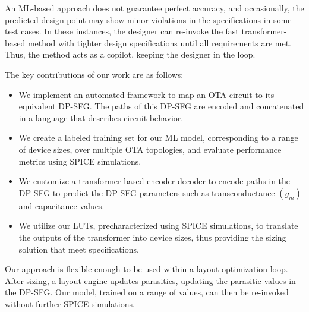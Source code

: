 An ML-based approach does not guarantee perfect accuracy, and occasionally, the predicted design point may show minor violations in the specifications in some test cases. 
In these instances, the designer can re-invoke the fast transformer-based method with tighter design specifications until all requirements are met. Thus, the method acts as a copilot, keeping the designer in the loop. 

The key contributions of our work are as follows:
\vspace{-0.05cm}
\begin{itemize}
\setlength\itemsep{0.05cm}
    \item We implement an automated framework to map an OTA circuit to its equivalent DP-SFG. The paths of this DP-SFG are encoded and concatenated in a language that describes circuit behavior.

    \item We create a labeled training set for our ML model, corresponding to a range of device sizes, over multiple OTA topologies, and evaluate performance metrics using SPICE simulations. 
    
    \item We customize a transformer-based encoder-decoder to encode paths in the DP-SFG
    to predict the DP-SFG parameters such as transconductance $(g_m)$ and capacitance values.
    
    \item We utilize our LUTs, precharacterized using SPICE simulations, to translate the outputs of the transformer into device sizes, thus providing the sizing solution that meet specifications.
\end{itemize}
Our approach is flexible enough to be used within a layout optimization loop. After sizing, a layout engine updates parasitics, updating the parasitic values in the DP-SFG.  Our model, trained on a range of values, can then be re-invoked without further SPICE simulations.

